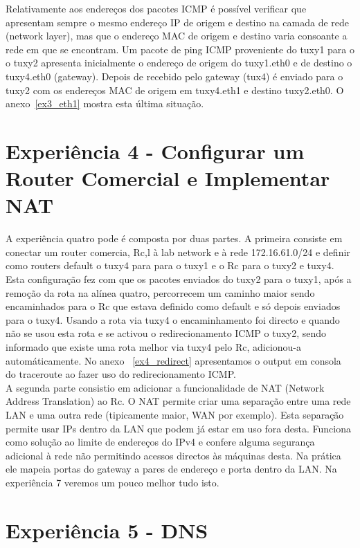 \documentclass[11pt,a4paper,reqno]{report}
\numberwithin{equation}{section}
\begin{document}
Relativamente aos endereços dos pacotes ICMP é possível verificar que apresentam sempre o mesmo endereço IP de origem e destino na camada de rede (network layer), mas que o endereço MAC de origem e destino varia consoante a rede em que se encontram. Um pacote de ping ICMP proveniente do tuxy1 para o o tuxy2 apresenta inicialmente o endereço de origem do tuxy1.eth0 e de destino o tuxy4.eth0 (gateway). Depois de recebido pelo gateway (tux4) é enviado para o tuxy2 com os endereços MAC de origem em tuxy4.eth1 e destino tuxy2.eth0. O anexo~\ref{ex3_eth1} mostra esta última situação.



\section{Experiência 4 - Configurar um Router Comercial e Implementar NAT}
A experiência quatro pode é composta por duas partes. A primeira consiste em conectar um router comercia, Rc,l à lab network e à rede 172.16.61.0/24 e definir como routers default o tuxy4 para para o tuxy1 e o Rc para o tuxy2 e tuxy4.
Esta configuração fez com que os pacotes enviados do tuxy2 para o tuxy1, após a remoção da rota na alínea quatro, percorrecem um caminho maior sendo encaminhados para o Rc que estava definido como default e só depois enviados para o tuxy4. Usando a rota via tuxy4 o encaminhamento foi directo e quando não se usou esta rota e se activou o redirecionamento ICMP o tuxy2, sendo informado que existe uma rota melhor via tuxy4 pelo Rc, adicionou-a automáticamente. No anexo ~\ref{ex4_redirect} apresentamos o output em consola do traceroute ao fazer uso do redirecionamento ICMP.\\

A segunda parte consistio em adicionar a funcionalidade de NAT (Network Address Translation) ao Rc.
O NAT permite criar uma separação entre uma rede LAN e uma outra rede (tipicamente maior, WAN por exemplo). Esta separação permite usar IPs dentro da LAN que podem já estar em uso fora desta. Funciona como solução ao limite de endereços do IPv4 e confere alguma segurança adicional à rede não permitindo acessos directos às máquinas desta. Na prática ele mapeia portas do gateway a pares de endereço e porta dentro da LAN. Na experiência 7 veremos um pouco melhor tudo isto.\\

\section{Experiência 5 - DNS}
\end{document}
